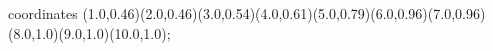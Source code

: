 					coordinates { (1.0,0.46)(2.0,0.46)(3.0,0.54)(4.0,0.61)(5.0,0.79)(6.0,0.96)(7.0,0.96)(8.0,1.0)(9.0,1.0)(10.0,1.0)};